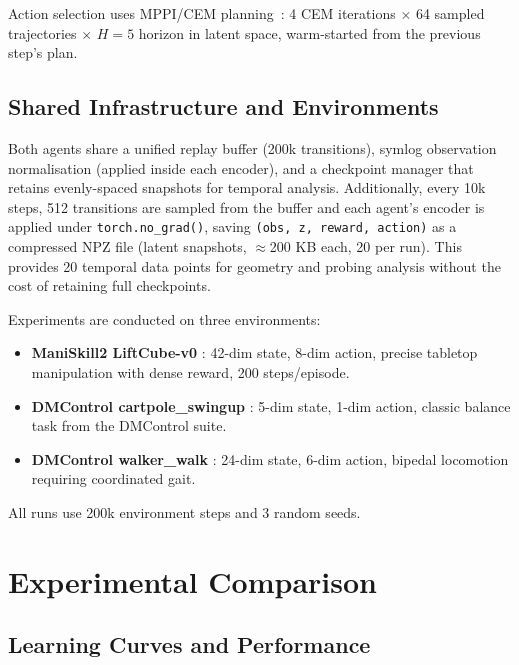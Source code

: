 \documentclass{article}
\begin{document}
Action selection uses MPPI/CEM planning~\citep{williams2017mppi,rubinstein1999cem}:
4 CEM iterations $\times$ 64 sampled trajectories $\times$ $H=5$ horizon in latent
space, warm-started from the previous step's plan.

\subsection{Shared Infrastructure and Environments}

Both agents share a unified replay buffer (200k transitions), symlog observation
normalisation (applied inside each encoder), and a checkpoint manager that retains
evenly-spaced snapshots for temporal analysis.
Additionally, every 10k steps, 512 transitions are sampled from the buffer and each
agent's encoder is applied under \texttt{torch.no\_grad()}, saving \texttt{(obs, z,
reward, action)} as a compressed NPZ file (latent snapshots, $\approx$200 KB each,
20 per run).
This provides 20 temporal data points for geometry and probing analysis without the
cost of retaining full checkpoints.

Experiments are conducted on three environments:
\begin{itemize}[nosep,leftmargin=1em]
  \item \textbf{ManiSkill2 LiftCube-v0} \citep{gu2023maniskill2}: 42-dim state,
        8-dim action, precise tabletop manipulation with dense reward, 200 steps/episode.
  \item \textbf{DMControl cartpole\_swingup} \citep{tunyasuvunakool2020dmcontrol}: 5-dim state,
        1-dim action, classic balance task from the DMControl suite.
  \item \textbf{DMControl walker\_walk} \citep{tunyasuvunakool2020dmcontrol}: 24-dim state,
        6-dim action, bipedal locomotion requiring coordinated gait.
\end{itemize}
All runs use 200k environment steps and 3 random seeds.

\section{Experimental Comparison}
\label{sec:experiments}

\subsection{Learning Curves and Performance}
\end{document}

